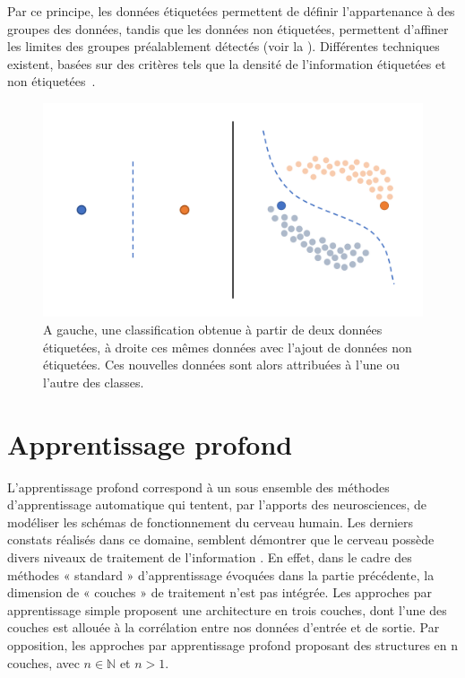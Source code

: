 Par ce principe, les données étiquetées permettent de définir l'appartenance à des groupes des données, tandis que les données non étiquetées, permettent d’affiner les limites des groupes préalablement détectés (voir la ). Différentes techniques existent, basées sur des critères tels que la densité de l’information étiquetées et non étiquetées~\cite{chapelle2005}.\par
 
\begin{figure}[H]
    \centering
    \includegraphics[width=\linewidth]{contents/chapter_3/resources/semi_supervised.pdf}
    \caption{A gauche, une classification obtenue à partir de deux données étiquetées, à droite ces mêmes données avec l’ajout de données non étiquetées. Ces nouvelles données sont alors attribuées à l’une ou l’autre des classes.}
    \label{fig:scheme_semi_supervised}
\end{figure}

\clearpage

\section{Apprentissage profond}
L’apprentissage profond correspond à un sous ensemble des méthodes d’apprentissage automatique qui tentent, par l’apports des neurosciences, de modéliser les schémas de fonctionnement du cerveau humain. Les derniers constats réalisés dans ce domaine, semblent démontrer que le cerveau possède divers niveaux de traitement de l’information . 
En effet, dans le cadre des méthodes « standard » d’apprentissage évoquées dans la partie précédente, la dimension de « couches » de traitement n’est pas intégrée. Les approches par apprentissage simple proposent une architecture en trois couches, dont l’une des couches est allouée à la corrélation entre nos données d’entrée et de sortie. Par opposition, les approches par apprentissage profond proposant des structures en n couches, avec $n \in \pmb{\mathbb{N}}$ et $n>1$.\par 


